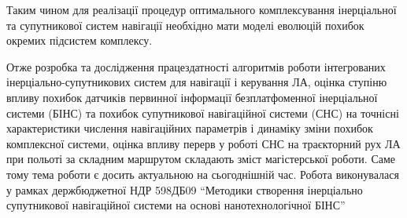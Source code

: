 Таким чином для реалізації процедур оптимального 
комплексування  інерціальної та супутникової систем навігації 
необхідно мати моделі еволюцій похибок окремих підсистем комплексу.

Отже розробка та дослідження працездатності алгоритмів роботи інтегрованих 
інерціально-супутникових систем для навігації і керування ЛА, оцінка 
ступіню впливу похибок датчиків первинної інформації безплатфоменної 
інерціальної системи (БІНС) та похибок супутникової навігаційної системи 
(СНС) на точнісні характеристики числення навігаційних параметрів і динаміку 
зміни похибок комплексної системи, оцінка впливу перерв у роботі СНС на 
траєкторний рух ЛА при польоті за складним маршрутом складають зміст 
магістерської роботи. Саме тому тема роботи є досить актуальною на 
сьогоднішній час. Робота виконувалася у рамках держбюджетної НДР 598ДБ09 ``Методики створення інерціально супутникової навігаційної системи на основі нанотехнологічної БІНС”